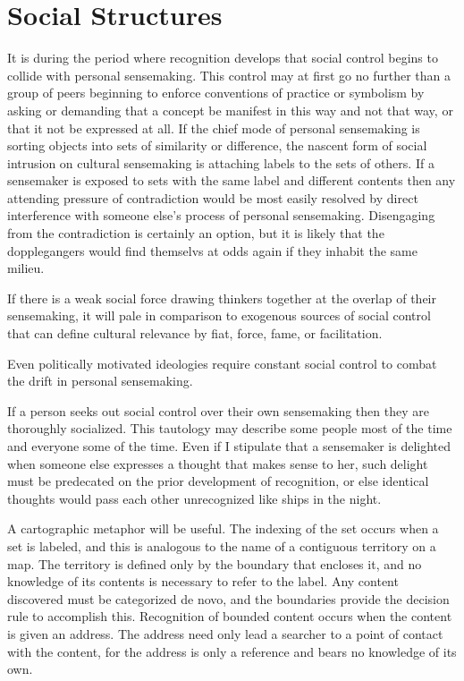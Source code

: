 \documentclass[]{article}
\begin{document}
\section{Social Structures}\label{social-structures}

It is during the period where recognition develops that social control
begins to collide with personal sensemaking. This control may at first
go no further than a group of peers beginning to enforce conventions of
practice or symbolism by asking or demanding that a concept be manifest
in this way and not that way, or that it not be expressed at all. If the
chief mode of personal sensemaking is sorting objects into sets of
similarity or difference, the nascent form of social intrusion on
cultural sensemaking is attaching labels to the sets of others. If a
sensemaker is exposed to sets with the same label and different contents
then any attending pressure of contradiction would be most easily
resolved by direct interference with someone else's process of personal
sensemaking. Disengaging from the contradiction is certainly an option,
but it is likely that the dopplegangers would find themselvs at odds
again if they inhabit the same milieu.

If there is a weak social force drawing thinkers together at the overlap
of their sensemaking, it will pale in comparison to exogenous sources of
social control that can define cultural relevance by fiat, force, fame,
or facilitation.

Even politically motivated ideologies require constant social control to
combat the drift in personal sensemaking.

If a person seeks out social control over their own sensemaking then
they are thoroughly socialized. This tautology may describe some people
most of the time and everyone some of the time. Even if I stipulate that
a sensemaker is delighted when someone else expresses a thought that
makes sense to her, such delight must be predecated on the prior
development of recognition, or else identical thoughts would pass each
other unrecognized like ships in the night.

A cartographic metaphor will be useful. The indexing of the set occurs
when a set is labeled, and this is analogous to the name of a contiguous
territory on a map. The territory is defined only by the boundary that
encloses it, and no knowledge of its contents is necessary to refer to
the label. Any content discovered must be categorized de novo, and the
boundaries provide the decision rule to accomplish this. Recognition of
bounded content occurs when the content is given an address. The address
need only lead a searcher to a point of contact with the content, for
the address is only a reference and bears no knowledge of its own.
\end{document}
